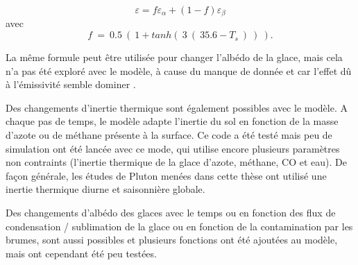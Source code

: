 \begin{equation}
\varepsilon= f \varepsilon_\alpha + (1-f) \varepsilon_\beta
\end{equation}
avec
\begin{equation}
f~=~0.5~(~1+tanh(~3~(~35.6-T_s~)~)~). 
\end{equation}


La même formule peut être utilisée pour changer l’albédo de la glace, mais cela n’a pas été exploré avec le modèle, à cause du manque de donnée et car l'effet dû à l'émissivité semble dominer \citep{Stan:99}.

Des changements d’inertie thermique sont également possibles avec le modèle. A chaque pas de temps, le modèle adapte l’inertie du sol en fonction de la masse d’azote ou de méthane présente à la surface. Ce code a été testé mais peu de simulation ont été lancée avec ce mode, qui utilise encore plusieurs paramètres non contraints (l’inertie thermique de la glace d’azote, méthane, CO et eau). De façon générale, les études de Pluton menées dans cette thèse ont utilisé une inertie thermique diurne et saisonnière globale. 

Des changements d’albédo des glaces avec le temps ou en fonction des flux de condensation / sublimation de la glace ou en fonction de la contamination par les brumes, sont aussi possibles et plusieurs fonctions ont été ajoutées au modèle, mais ont cependant été peu testées. 


